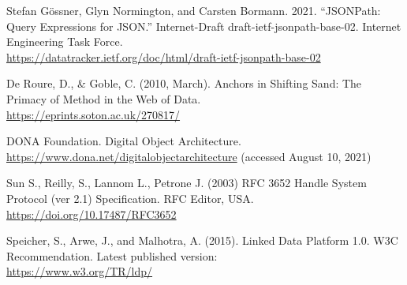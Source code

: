 \begin{thebibliography}{9}
Stefan Gössner, Glyn Normington, and Carsten Bormann. 2021.
``JSONPath: Query Expressions for JSON.'' Internet-Draft
draft-ietf-jsonpath-base-02. Internet Engineering Task Force.\\
\url{https://datatracker.ietf.org/doc/html/draft-ietf-jsonpath-base-02}

De Roure, D., \& Goble, C. (2010, March). Anchors in Shifting
Sand: The Primacy of Method in the Web of Data.\\
\url{https://eprints.soton.ac.uk/270817/}

DONA Foundation. Digital Object Architecture.\\
\url{https://www.dona.net/digitalobjectarchitecture} (accessed August
10, 2021)

Sun S., Reilly, S., Lannom L., Petrone J. (2003) RFC 3652
Handle System Protocol (ver 2.1) Specification. RFC Editor, USA.\\
\url{https://doi.org/10.17487/RFC3652}


Speicher, S., Arwe, J., and Malhotra, A. (2015). Linked Data
Platform 1.0. W3C Recommendation. Latest published version:\\
\url{https://www.w3.org/TR/ldp/}


\end{thebibliography}

